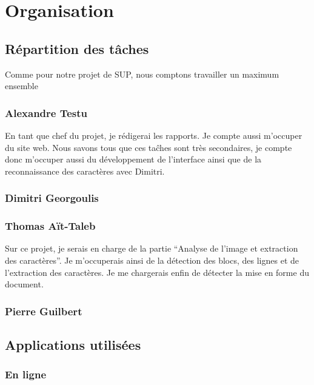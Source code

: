 \documentclass[]{report}
\begin{document}
\chapter{Organisation} %
\label{cha:organisation}
	\section{R\'epartition des t\^aches} %
	\label{sec:r'epartition_des_t^aches}
		Comme pour notre projet de SUP, nous comptons travailler un maximum ensemble
		\subsection{Alexandre Testu} %
		\label{sub:alexandre_testu}
			En tant que chef du projet, je r\'edigerai les rapports. Je compte aussi m'occuper du site web. Nous savons tous que ces ta\^ches sont tr\`es secondaires, je compte donc m'occuper aussi du d\'eveloppement de l'interface ainsi que de la reconnaissance des caract\`eres avec Dimitri.
		\subsection{Dimitri Georgoulis} %
		\label{sub:dimitri_georgoulis}
		
		\subsection{Thomas A\"it-Taleb} %
		\label{sub:thomas_a"it_taleb}
      Sur ce projet, je serais en charge de la partie ``Analyse de l'image et extraction des caractères''. Je m'occuperais ainsi de la détection des blocs, des lignes et de l'extraction des caractères. Je me chargerais enfin de détecter la mise en forme du document.
		\subsection{Pierre Guilbert} %
		\label{sub:pierre_guilbert}
		
	
	\section{Applications utilis\'ees} %
	\label{sec:applications_utilis'ees}
		\subsection{En ligne} %
		\label{sub:en_ligne}
\end{document}
